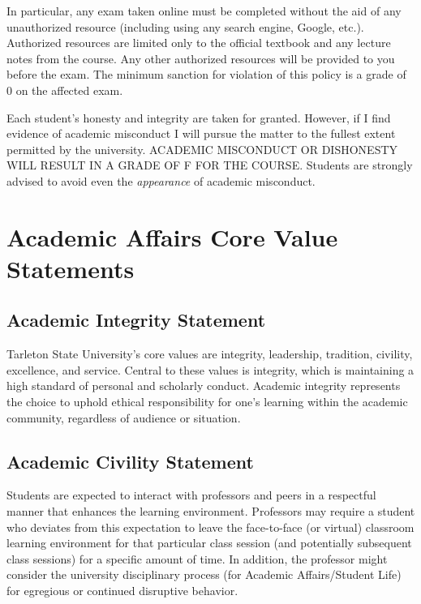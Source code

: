 \documentclass[10pt]{article}
\begin{document}
In particular, any exam taken online must be completed without the aid of any unauthorized resource (including using any search engine, Google, etc.).  Authorized resources are limited only to the official textbook and any lecture notes from the course.  Any other authorized resources will be provided to you before the exam.  The minimum sanction for violation of this policy is a grade of 0 on the affected exam.

Each student’s honesty and integrity are taken for granted. However, if I find evidence of academic misconduct I will pursue the matter to the fullest extent permitted by the university. ACADEMIC MISCONDUCT OR DISHONESTY WILL RESULT IN A GRADE OF F FOR THE COURSE.  Students are strongly advised to avoid even the \emph{appearance} of academic misconduct. 

\section*{Academic Affairs Core Value Statements}
\label{sec:org67a105e}
\subsection*{Academic Integrity Statement}
\label{sec:org2ddb031}
Tarleton State University's core values are integrity, leadership, tradition, civility, excellence, and service.  Central to these values is integrity, which is maintaining a high standard of personal and scholarly conduct.  Academic integrity represents the choice to uphold ethical responsibility for one’s learning within the academic community, regardless of audience or situation.

\subsection*{Academic Civility Statement}
\label{sec:org74493a1}
Students are expected to interact with professors and peers in a respectful manner that enhances the learning environment. Professors may require a student who deviates from this expectation to leave the face-to-face (or virtual) classroom learning environment for that particular class session (and potentially subsequent class sessions) for a specific amount of time. In addition, the professor might consider the university disciplinary process (for Academic Affairs/Student Life) for egregious or continued disruptive behavior.
\end{document}
